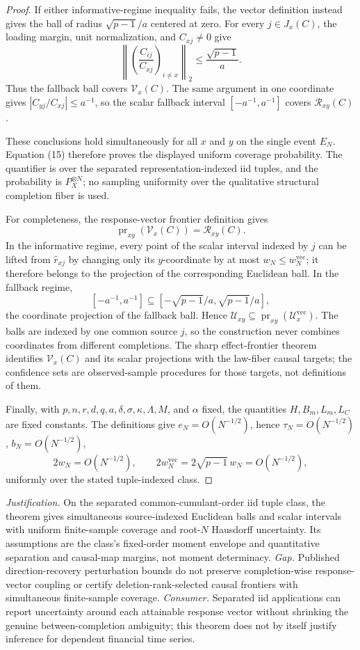 \documentclass{article}
\begin{document}
\begin{proof}
If either informative-regime inequality fails, the vector definition instead gives the ball of radius \(\sqrt{p-1}/a\) centered at zero. For every \(j\in J_x(C)\), the loading margin, unit normalization, and \(C_{xj}\ne0\) give
\[
 \left\lVert
 \left(\frac{C_{ij}}{C_{xj}}\right)_{i\ne x}
 \right\rVert_2
 \le\frac{\sqrt{p-1}}a.
\]
Thus the fallback ball covers \(\mathcal V_x(C)\). The same argument in one coordinate gives \(|C_{yj}/C_{xj}|\le a^{-1}\), so the scalar fallback interval \([-a^{-1},a^{-1}]\) covers \(\mathcal R_{xy}(C)\).

These conclusions hold simultaneously for all \(x\) and \(y\) on the single event \(E_N\). Equation (15) therefore proves the displayed uniform coverage probability. The quantifier is over the separated representation-indexed iid tuples, and the probability is \(P_X^{\otimes N}\); no sampling uniformity over the qualitative structural completion fiber is used.

For completeness, the response-vector frontier definition gives
\[
 \operatorname{pr}_{xy}(\mathcal V_x(C))=\mathcal R_{xy}(C).
\]
In the informative regime, every point of the scalar interval indexed by \(j\) can be lifted from \(\widehat r_{xj}\) by changing only its \(y\)-coordinate by at most \(w_N\le w_N^{\mathrm{vec}}\); it therefore belongs to the projection of the corresponding Euclidean ball. In the fallback regime,
\[
 [-a^{-1},a^{-1}]
 \subseteq[-\sqrt{p-1}/a,\sqrt{p-1}/a],
\]
the coordinate projection of the fallback ball. Hence \(\mathcal U_{xy}\subseteq\operatorname{pr}_{xy}(\mathcal U_x^{\mathrm{vec}})\). The balls are indexed by one common source \(j\), so the construction never combines coordinates from different completions. The sharp effect-frontier theorem identifies \(\mathcal V_x(C)\) and its scalar projections with the law-fiber causal targets; the confidence sets are observed-sample procedures for those targets, not definitions of them.

Finally, with \(p,n,r,d,q,a,\delta,\sigma,\kappa,\Lambda,M\), and \(\alpha\) fixed, the quantities \(H,B_m,L_m,L_C\) are fixed constants. The definitions give \(e_N=O(N^{-1/2})\), hence \(\tau_N=O(N^{-1/2})\), \(b_N=O(N^{-1/2})\),
\[
 2w_N=O(N^{-1/2}),
 \qquad
 2w_N^{\mathrm{vec}}=2\sqrt{p-1}\,w_N=O(N^{-1/2}),
\]
uniformly over the stated tuple-indexed class.
\end{proof}
\par\smallskip\noindent \textit{Justification.} On the separated common-cumulant-order iid tuple class, the theorem gives simultaneous source-indexed Euclidean balls and scalar intervals with uniform finite-sample coverage and root-\(N\) Hausdorff uncertainty. Its assumptions are the class's fixed-order moment envelope and quantitative separation and causal-map margins, not moment determinacy. \textit{Gap.} Published direction-recovery perturbation bounds do not preserve completion-wise response-vector coupling or certify deletion-rank-selected causal frontiers with simultaneous finite-sample coverage. \textit{Consumer.} Separated iid applications can report uncertainty around each attainable response vector without shrinking the genuine between-completion ambiguity; this theorem does not by itself justify inference for dependent financial time series.
\end{document}
